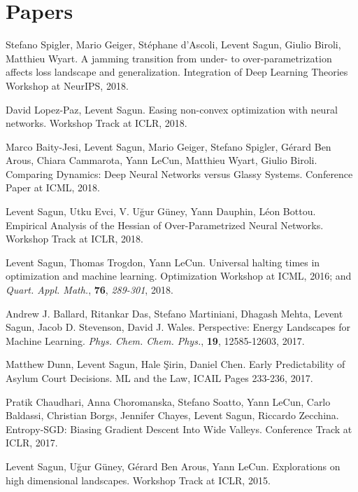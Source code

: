 \documentclass[10pt,letterpaper]{article}
\renewenvironment{itemize}
{
\begin{list}{}{\setlength{\leftmargin}{1.5em}}
}
{
  \end{list}
}
\begin{document}
\section*{Papers}
\begin{itemize}
\item Stefano Spigler, Mario Geiger, St\'ephane d'Ascoli, Levent Sagun, Giulio Biroli, Matthieu Wyart. A jamming transition from under- to over-parametrization affects loss landscape and generalization. Integration of Deep Learning Theories Workshop at NeurIPS, 2018.

\item David Lopez-Paz, Levent Sagun. Easing non-convex optimization with neural networks. Workshop Track at ICLR, 2018.

\item Marco Baity-Jesi, Levent Sagun, Mario Geiger, Stefano Spigler, G\'erard Ben Arous, Chiara Cammarota, Yann LeCun, Matthieu Wyart, Giulio Biroli. Comparing Dynamics: Deep Neural Networks versus Glassy Systems. Conference Paper at ICML, 2018.

\item Levent Sagun, Utku Evci, V. U\u{g}ur G\"uney, Yann Dauphin, L\'eon Bottou. Empirical Analysis of the Hessian of Over-Parametrized Neural Networks. Workshop Track at ICLR, 2018.

\item  Levent Sagun, Thomas Trogdon, Yann LeCun. Universal halting times in optimization and machine learning. Optimization Workshop at ICML, 2016; and \textit{Quart. Appl. Math.}, \textbf{76}, \textit{289-301}, 2018.

\item Andrew J. Ballard, Ritankar Das, Stefano Martiniani, Dhagash Mehta, Levent Sagun, Jacob D. Stevenson, David J. Wales. Perspective: Energy Landscapes for Machine Learning. \textit{Phys. Chem. Chem. Phys.}, \textbf{19}, 12585-12603, 2017.

\item Matthew Dunn, Levent Sagun, Hale \c{S}irin, Daniel Chen. Early Predictability of Asylum Court Decisions. ML and the Law, ICAIL Pages 233-236, 2017.

\item Pratik Chaudhari, Anna Choromanska, Stefano Soatto, Yann LeCun, Carlo Baldassi, Christian Borgs, Jennifer Chayes, Levent Sagun, Riccardo Zecchina. Entropy-SGD: Biasing Gradient Descent Into Wide Valleys. Conference Track at ICLR, 2017.


\item  Levent Sagun, U\u{g}ur G\"uney, G\'erard Ben Arous, Yann LeCun. Explorations on high dimensional landscapes. Workshop Track at ICLR, 2015.
\end{itemize}
\end{document}

